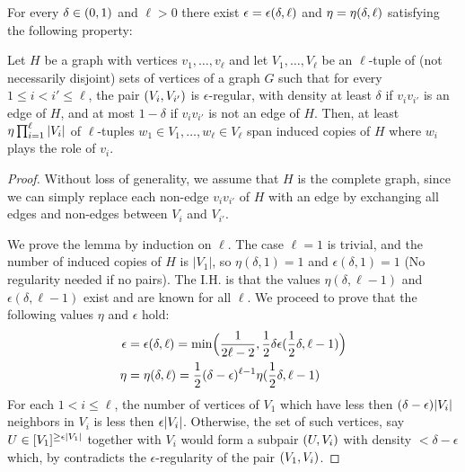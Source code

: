         \begin{lemma} \label{lem:H_like_partition_implies_H_abundance}
            For every $\delta \in ( 0, 1 )$ and $\ell > 0$ there exist $\epsilon = \epsilon ( \delta, \ell )$ and
            $\eta = \eta ( \delta, \ell )$ satisfying the following property:

            Let $H$ be a graph with vertices $v_1, \dots,v_\ell$ and let $V_1, \dots, V_\ell$ be an $\ell$-tuple of (not necessarily disjoint)
            sets of vertices of a graph $G$ such that for every $1 \leq i < i' \leq \ell$, the pair $( V_i, V_{i'} )$
            is $\epsilon$-regular, with density at least $\delta$ if $v_i v_{i'}$ is an edge of $H$, and at most $1 - \delta$
            if $v_i v_{i'}$ is not an edge of $H$.
            Then, at least $\eta \prod_{i=1}^\ell | V_i |$ of $\ell$-tuples $w_1 \in V_1, \dots, w_\ell \in V_\ell$
            span induced copies of $H$ where $w_i$ plays the role of $v_i$.
            \begin{proof}
                Without loss of generality, we assume that $H$ is the complete graph, since we can simply replace each non-edge
                $v_i v_{i'}$ of $H$ with an edge by exchanging all edges and non-edges between $V_i$ and $V_{i'}$.

                We prove the lemma by induction on $\ell$.
                The case $\ell=1$ is trivial, and the number of induced copies of $H$ is $|V_1|$, so $\eta(\delta, 1) = 1$ and
                $\epsilon(\delta, 1) = 1$ (No regularity needed if no pairs).
                The I.H. is that the values $\eta(\delta, \ell-1)$ and $\epsilon(\delta, \ell-1)$ exist and are known for all
                $\ell$.
                We proceed to prove that the following values $\eta$ and $\epsilon$ hold:
                \begin{align*}
                    \epsilon &= \epsilon(\delta, \ell)
                        = \min \Bigl( \frac{1}{2\ell - 2}, \frac{1}{2} \delta \epsilon(\frac{1}{2}\delta, \ell-1) \Bigr) \\
                    \eta &= \eta(\delta, \ell)
                        = \frac{1}{2} (\delta - \epsilon)^{\ell-1} \eta(\frac{1}{2}\delta, \ell-1)
                \end{align*}
                For each $1 < i \leq \ell$, the number of vertices of $V_1$ which have less then
                $(\delta - \epsilon) | V_i |$ neighbors in $V_i$ is less then $\epsilon | V_i |$.
                Otherwise, the set of such vertices, say $U \in [V_1]^{\geq \epsilon | V_1 |}$ together with $V_i$
                would form a subpair $( U, V_i )$ with density $< \delta - \epsilon$ which, by
                 contradicts the $\epsilon$-regularity of the pair $( V_1, V_i )$.


\end{proof}
\end{lemma}
